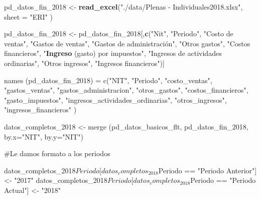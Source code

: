 \documentclass[
  11pt,
]{book}
\newenvironment{Shaded}{\begin{snugshade}}{\end{snugshade}}
\newcommand{\DataTypeTok}[1]{\textcolor[rgb]{0.13,0.29,0.53}{#1}}
\newcommand{\DecValTok}[1]{\textcolor[rgb]{0.00,0.00,0.81}{#1}}
\newcommand{\KeywordTok}[1]{\textcolor[rgb]{0.13,0.29,0.53}{\textbf{#1}}}
\newcommand{\NormalTok}[1]{#1}
\newcommand{\StringTok}[1]{\textcolor[rgb]{0.31,0.60,0.02}{#1}}
\begin{document}
\begin{Shaded}
\begin{Highlighting}[]
\NormalTok{pd_datos_fin_}\DecValTok{2018}\NormalTok{ <-}\StringTok{ }\KeywordTok{read_excel}\NormalTok{(}\StringTok{"./data/Plenas - Individuales2018.xlsx"}\NormalTok{, }
                                \DataTypeTok{sheet =} \StringTok{"ERI"}\NormalTok{ )}

\NormalTok{pd_datos_fin_}\DecValTok{2018}\NormalTok{ <-}\StringTok{ }\NormalTok{pd_datos_fin_}\DecValTok{2018}\NormalTok{[,}\KeywordTok{c}\NormalTok{(}\StringTok{"Nit"}\NormalTok{, }\StringTok{"Periodo"}\NormalTok{, }\StringTok{"Costo de ventas"}\NormalTok{, }
  \StringTok{"Gastos de ventas"}\NormalTok{, }\StringTok{"Gastos de administración", "}\NormalTok{Otros gastos}\StringTok{", }
\StringTok{  "}\NormalTok{Costos financieros}\StringTok{", "}\KeywordTok{Ingreso}\NormalTok{ (gasto) por impuestos}\StringTok{", }
\StringTok{  "}\NormalTok{Ingresos de actividades ordinarias}\StringTok{", "}\NormalTok{Otros ingresos}\StringTok{", "}\NormalTok{Ingresos financieros}\StringTok{")]}

\StringTok{names (pd_datos_fin_2018) = c("}\NormalTok{NIT}\StringTok{", "}\NormalTok{Periodo}\StringTok{", "}\NormalTok{costo_ventas}\StringTok{", "}\NormalTok{gastos_ventas}\StringTok{",}
\StringTok{  "}\NormalTok{gastos_administracion}\StringTok{", "}\NormalTok{otros_gastos}\StringTok{", "}\NormalTok{costos_financieros}\StringTok{", "}\NormalTok{gasto_impuestos}\StringTok{",}
\StringTok{  "}\NormalTok{ingresos_actividades_ordinarias}\StringTok{", "}\NormalTok{otros_ingresos}\StringTok{", "}\NormalTok{ingresos_financieros}\StringTok{" )}

\StringTok{datos_completos_2018 <- merge (pd_datos_basicos_flt, pd_datos_fin_2018,}
\StringTok{                               by.x="}\NormalTok{NIT}\StringTok{", by.y="}\NormalTok{NIT}\StringTok{")}

\StringTok{#Le damos formato a los periodos}

\StringTok{datos_completos_2018$Periodo[datos_completos_2018$Periodo == "}\NormalTok{Periodo Anterior}\StringTok{"] <- }
\StringTok{  "}\DecValTok{2017}\StringTok{"}
\StringTok{datos_completos_2018$Periodo[datos_completos_2018$Periodo == "}\NormalTok{Periodo Actual}\StringTok{"] <- }
\StringTok{  "}\DecValTok{2018}\StringTok{"}
\end{Highlighting}
\end{Shaded}
\end{document}
